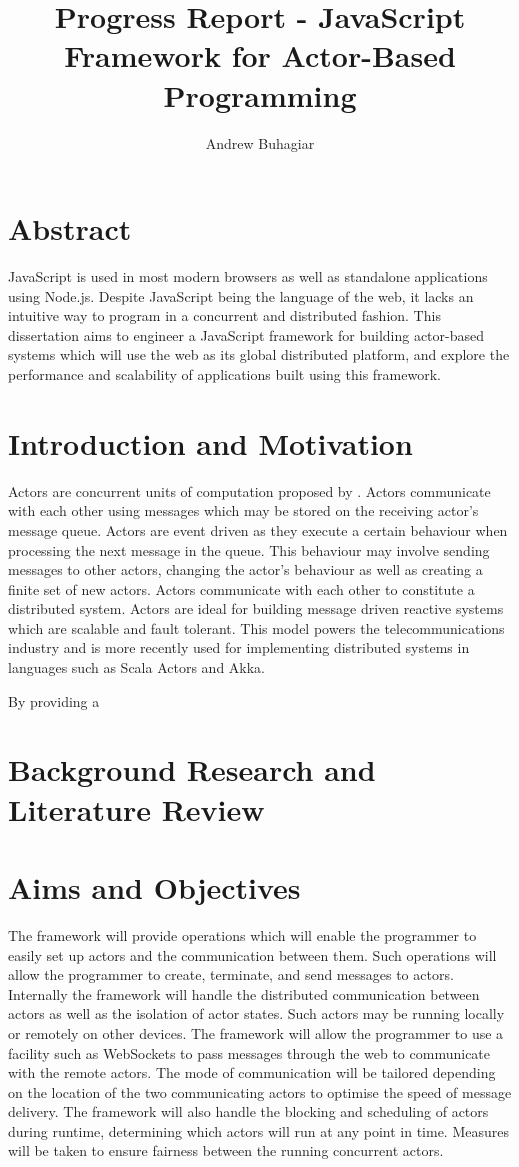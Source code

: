 \documentclass[12pt]{report}
\author{Andrew Buhagiar}
\title{Progress Report - JavaScript Framework for Actor-Based Programming}
\begin{document}
\maketitle
\tableofcontents
\newpage
\section{Abstract}
JavaScript is used in most modern browsers as well as standalone applications using Node.js. Despite JavaScript being the language of the web, it lacks an intuitive way to program in a concurrent and distributed fashion. This dissertation aims to engineer a JavaScript framework for building actor-based systems which will use the web as its global distributed platform, and explore the performance and scalability of applications built using this framework.
\section{Introduction and Motivation}
Actors are concurrent units of computation proposed by \cite{hewitt1973session}. Actors communicate with each other using messages which may be stored on the receiving actor's message queue\cite{43years}. Actors are event driven as they execute a certain behaviour when processing the next message in the queue. This behaviour may involve sending messages to other actors, changing the actor's behaviour as well as creating a finite set of new actors. Actors communicate with each other to constitute a distributed system. Actors are ideal for building message driven reactive systems~\cite{reactivemanifesto} which are scalable and fault tolerant. This model powers the telecommunications industry and is more recently used for implementing distributed systems in languages such as Scala Actors and Akka\cite{haller2012integration}.

By providing a 
\section{Background Research and Literature Review}
\section{Aims and Objectives}
The framework will provide operations which will enable the programmer to easily set up actors and the communication between them. Such operations will allow the programmer to create, terminate, and send messages to actors. Internally the framework will handle the distributed communication between actors as well as the isolation of actor states. Such actors may be running locally or remotely on other devices. The framework will allow the programmer to use a facility such as WebSockets to pass messages through the web to communicate with the remote actors. The mode of communication will be tailored depending on the location of the two communicating actors to optimise the speed of message delivery. The framework will also handle the blocking and scheduling of actors during runtime, determining which actors will run at any point in time. Measures will be taken to ensure fairness between the running concurrent actors.
\end{document}
